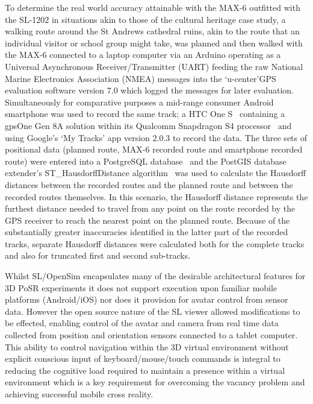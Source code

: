To determine the real world accuracy attainable with the MAX-6 outfitted with the SL-1202 in situations akin to those of the cultural heritage case study, a walking route around the St Andrews cathedral ruins, akin to the route that an individual visitor or school group might take, was planned and then walked with the MAX-6 connected to a laptop computer via an Arduino operating as a Universal Asynchronous Receiver/Transmitter (UART) feeding the raw National Marine Electronics Association (NMEA) messages into the `u-center'GPS evaluation software version 7.0 which logged the messages for later evaluation. Simultaneously for comparative purposes a mid-range consumer Android smartphone was used to record the same track; a HTC One S~\cite{HTCCorporation2013} containing a gpsOne Gen 8A solution within its Qualcomm Snapdragon S4 processor~\cite{QualcommIncorporated2013} and using Google's `My Tracks' app version 2.0.3 to record the data. The three sets of positional data (planned route, MAX-6 recorded route and smartphone recorded route) were entered into a PostgreSQL database~\cite{Daviesc,Daviesb} and the PostGIS database extender's ST\_HausdorffDistance algorithm~\cite{PostGIS} was used to calculate the Hausdorff distances between the recorded routes and the planned route and between the recorded routes themselves. In this scenario, the Hausdorff distance represents the furthest distance needed to travel from any point on the route recorded by the GPS receiver to reach the nearest point on the planned route. Because of the substantially greater inaccuracies identified in the latter part of the recorded tracks, separate Hausdorff distances were calculated both for the complete tracks and also for truncated first and second sub-tracks.

Whilst SL/OpenSim encapsulates many of the desirable architectural features for 3D PoSR experiments it does not support execution upon familiar mobile platforms (Android/iOS) nor does it provision for avatar control from sensor data. However the open source nature of the SL viewer allowed modifications to be effected, enabling control of the avatar and camera from real time data collected from position and orientation sensors connected to a tablet computer. This ability to control navigation within the 3D virtual environment without explicit conscious input of keyboard/mouse/touch commands is integral to reducing the cognitive load required to maintain a presence within a virtual environment which is a key requirement for overcoming the vacancy problem and achieving successful mobile cross reality.



